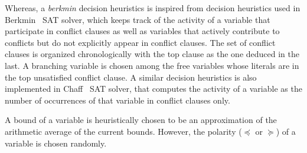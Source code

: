 Whereas, a {\em berkmin} decision heuristics is inspired 
from decision heuristics used in Berkmin~\cite{eugoldberg07} SAT solver, which 
keeps track of the activity of a variable that participate in conflict clauses 
as well as variables that actively contribute to conflicts but do not explicitly 
appear in conflict clauses.  The set of conflict clauses is organized 
chronologically with the top clause as the one deduced in the last.  A 
branching variable is chosen among the free variables whose literals are 
in the top unsatisfied conflict clause.  A similar decision heuristics is 
also implemented in Chaff~\cite{chaff} SAT solver, that computes the activity 
of a variable as the number of occurrences of that variable in conflict 
clauses only. 

A bound of a variable  is heuristically chosen to be an approximation of the 
arithmetic average of the current bounds.  However, the polarity ($\preceq$ or
$\succeq$) of a variable is chosen randomly.  
